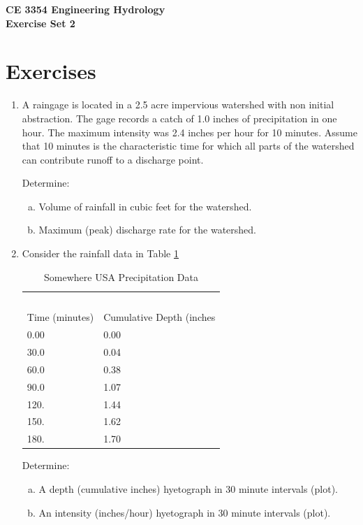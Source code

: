\documentclass[12pt]{article}
\begin{document}
\begin{center}
{\textbf{{ CE 3354 Engineering Hydrology} \\ {Exercise Set 2}}}
\end{center}

\section*{\small{Exercises}}
\begin{enumerate}
\item A raingage is located in a 2.5 acre impervious watershed with non initial abstraction.  The gage records a catch of 1.0 inches of precipitation in one hour.  The maximum intensity was 2.4 inches per hour for 10 minutes.  Assume that 10 minutes is the characteristic time for which all parts of the watershed can contribute runoff to a discharge point.

Determine:
    \begin{enumerate}[a)]
        \item Volume of rainfall in cubic feet for the watershed. 
        \item Maximum (peak) discharge rate for the watershed.
    \end{enumerate}

\clearpage

\item Consider the rainfall data in Table \ref{tab:SomewhereUSARain}

\begin{table}[h!]
\centering
\caption{Somewhere USA Precipitation Data}
\begin{tabular}{p{2.0in}p{2.0in}} %
~&~\\
Time (minutes) & Cumulative Depth (inches\\
\hline
\hline
0.00 & 0.00 \\
30.0 & 0.04 \\
60.0 & 0.38 \\
90.0 & 1.07 \\
120. & 1.44 \\
150. & 1.62 \\
180. & 1.70 \\
\hline
\end{tabular}
\label{tab:SomewhereUSARain}
\end{table}

Determine:
    \begin{enumerate}[a)]
        \item A depth (cumulative inches) hyetograph in 30 minute intervals (plot). 
        \item An intensity (inches/hour) hyetograph in 30 minute intervals (plot).
    \end{enumerate}


\end{enumerate}
\end{document}
